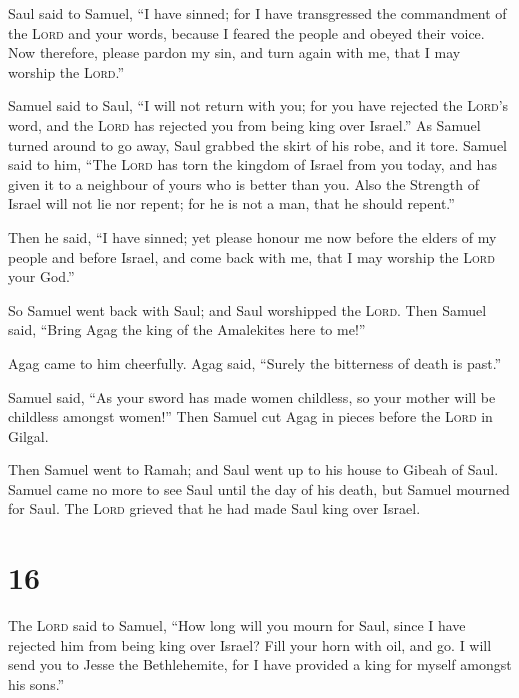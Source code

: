  Saul said to Samuel, ``I have sinned; for I have
transgressed the commandment of the \textsc{Lord} and your words,
because I feared the people and obeyed their voice.  Now
therefore, please pardon my sin, and turn again with me, that I may
worship the \textsc{Lord}.''

 Samuel said to Saul, ``I will not return with you; for
you have rejected the \textsc{Lord}'s word, and the \textsc{Lord} has
rejected you from being king over Israel.''  As Samuel
turned around to go away, Saul grabbed the skirt of his robe, and it
tore.  Samuel said to him, ``The \textsc{Lord} has torn
the kingdom of Israel from you today, and has given it to a neighbour of
yours who is better than you.  Also the Strength of
Israel will not lie nor repent; for he is not a man, that he should
repent.''

 Then he said, ``I have sinned; yet please honour me now
before the elders of my people and before Israel, and come back with me,
that I may worship the \textsc{Lord} your God.''

 So Samuel went back with Saul; and Saul worshipped the
\textsc{Lord}.  Then Samuel said, ``Bring Agag the king
of the Amalekites here to me!''

Agag came to him cheerfully. Agag said, ``Surely the bitterness of death
is past.''

 Samuel said, ``As your sword has made women childless,
so your mother will be childless amongst women!'' Then Samuel cut Agag
in pieces before the \textsc{Lord} in Gilgal.

 Then Samuel went to Ramah; and Saul went up to his house
to Gibeah of Saul.  Samuel came no more to see Saul until
the day of his death, but Samuel mourned for Saul. The \textsc{Lord}
grieved that he had made Saul king over Israel.

\hypertarget{section-15}{%
\section{16}\label{section-15}}

 The \textsc{Lord} said to Samuel, ``How long will you
mourn for Saul, since I have rejected him from being king over Israel?
Fill your horn with oil, and go. I will send you to Jesse the
Bethlehemite, for I have provided a king for myself amongst his sons.''

